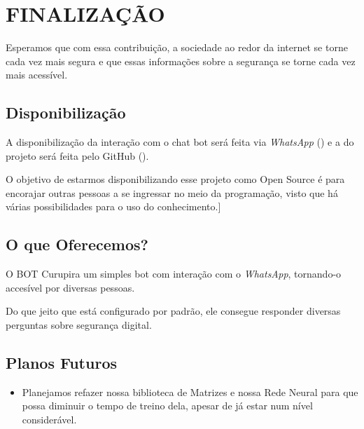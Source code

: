 \chapter{\uppercase{Finalização}}
\label{conclusao}

Esperamos que com essa contribuição, a sociedade ao redor da internet se torne cada vez mais segura e que essas informações sobre a segurança se torne cada vez mais acessível.

\section{Disponibilização}
    A disponibilização da interação com o chat bot será feita via \textit{WhatsApp} () e a do projeto será feita pelo GitHub ().\par
    O objetivo de estarmos disponibilizando esse projeto como Open Source é para encorajar outras pessoas a se ingressar no meio da programação, visto que há várias possibilidades para o uso do conhecimento.]
    
\section{O que Oferecemos?}
    O BOT Curupira um simples bot com interação com o \textit{WhatsApp}, tornando-o accesível por diversas pessoas.\par
    Do que jeito que está configurado por padrão, ele consegue responder diversas perguntas sobre segurança digital.


 \section{Planos Futuros}
    \begin{itemize}
        \item Planejamos refazer nossa biblioteca de Matrizes e nossa Rede Neural para que possa diminuir o tempo de treino dela, apesar de já estar num nível considerável.
    \end{itemize}